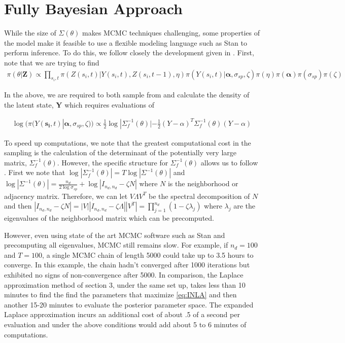\documentclass[11pt]{isuthesis}
\begin{document}
	\section{Fully Bayesian Approach}
	
	While the size of $\Sigma(\theta)$ makes MCMC techniques challenging, some properties of the model make it feasible to use a flexible modeling language such as Stan to perform inference.  To do this, we follow closely the development given in \cite{joseph}.  First, note that we are trying to find
	\begin{align}
	\pi(\theta | \boldsymbol{Z})\propto \prod_{s_i,t} \pi(Z(s_i,t)|Y(s_i,t),Z(s_i,t-1),\eta) \pi(Y(s_i,t)|\boldsymbol{\alpha},\sigma_{sp},\zeta)\pi(\eta)\pi(\boldsymbol{\alpha})\pi(\sigma_{sp})\pi(\zeta)
	\end{align}
	
	In the above, we are required to both sample from and calculate the density of the latent state, $\boldsymbol{Y}$ which requires evaluations of 
	
	
	\begin{align}
	\log(\pi(Y(\boldsymbol{s_i},t)|\boldsymbol{\alpha},\sigma_{sp},\zeta)) \propto  \frac{1}{2} \log | \Sigma_f^{-1}(\theta)| - \frac{1}{2}(Y-\alpha)^T\Sigma_f^{-1}(\theta)(Y-\alpha) \label{eq:log Y}
	\end{align}
	
	To speed up computations, we note that the greatest computational cost in the sampling is the calculation of the determinant of the potentially very large matrix, $\Sigma_f^{-1}(\theta)$.  However, the specific structure for $\Sigma_f^{-1}(\theta)$ allows us to follow \cite{jin2005generalized}.  First we note that $\log | \Sigma_f^{-1}(\theta)|  = T \log | \Sigma^{-1}(\theta)|$ and $\log|\Sigma^{-1}(\theta)|=\frac{n_d}{2\log\sigma_{sp}}+\log|I_{n_d,n_d}-\zeta N|$ where $N$ is the neighborhood or adjacency matrix.  Therefore, we can let $V \Lambda V^T$ be the spectral decomposition of $N$ and then $|I_{n_d,n_d}-\zeta N|=|V| |I_{n_d,n_d}-\zeta \Lambda| |V^T|=\prod_{j=1}^{n_d}\left(1-\zeta \lambda_j\right)$ where $\lambda_j$ are the eigenvalues of the neighborhood matrix which can be precomputed.  
	
	However, even using state of the art MCMC software such as Stan and precomputing all eigenvalues, MCMC still remains slow.  For example, if $n_d=100$ and $T=100$, a single MCMC chain of length 5000 could take up to 3.5 hours to converge.  In this example, the chain hadn't converged after 1000 iterations but exhibited no signs of non-convergence after 5000.  In comparison, the Laplace approximation method of section 3, under the same set up, takes less than 10 minutes to find the find the parameters that maximize \eqref{eq:INLA} and then another 15-20 minutes to evaluate the posterior parameter space.  The expanded Laplace approximation incurs an additional cost of about .5 of a second per evaluation and under the above conditions would add about 5 to 6 minutes of computations.
	
\end{document}
